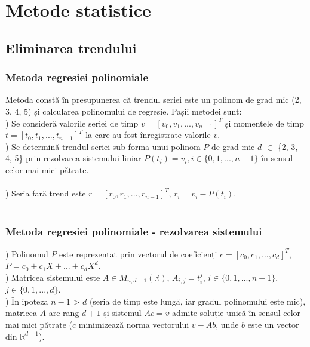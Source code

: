 \chapter{Metode statistice}

\section{Eliminarea trendului}
\subsection{Metoda regresiei polinomiale}

\noindent Metoda constă în presupunerea că trendul seriei este un polinom de grad mic (2, 3, 4, 5) și calcularea polinomului de regresie. Pașii metodei sunt:\\

) Se consideră valorile seriei de timp $v = [v_0, v_1, ..., v_{n-1}]^T$ și momentele de timp $t = [t_0, t_1, ..., t_{n-1}]^T$ 
la care au fost înregistrate valorile $v$. \\

) Se determină trendul seriei sub forma unui polinom $P$ de grad mic $d$ $\in$ \{2, 3, 4, 5\} prin rezolvarea sistemului liniar $P(t_i)=v_i, 
i \in \{0, 1, ..., n-1\}$ în sensul celor mai mici pătrate. \\ \\
) Seria fără trend este $r = [r_0, r_1, ..., r_{n-1}]^T$, $r_i = v_i - P(t_i)$.\\
\\

\subsection{Metoda regresiei polinomiale - rezolvarea sistemului}
) Polinomul $P$ este reprezentat prin vectorul de coeficienți $c = [c_0, c_1, ..., c_d]^T$, $P = c_0 + c_1X + ... + c_dX^d$.\\

) Matricea sistemului este $A \in M_{n,d+1}(\mathbb{R})$, $A_{i,j} = t_i^j$, $i \in \{0, 1, ..., n-1\}$, $j \in \{0, 1, ..., d\}$.\\

) În ipoteza $n-1$ > $d$ (seria de timp este lungă, iar gradul polinomului este mic), matricea $A$ are rang $d+1$ și sistemul $Ac = v$ admite soluție unică în sensul celor mai mici pătrate ($c$ minimizează norma vectorului $v-Ab$, unde $b$ este un vector din $\mathbb{R}^{d+1}$).\\

